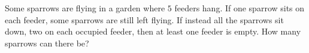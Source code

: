 Some sparrows are flying in a garden where $5$ feeders hang. If one sparrow sits on each feeder, some sparrows are still left flying. If instead all the sparrows sit down, two on each occupied feeder, then at least one feeder is empty. How many sparrows can there be?
